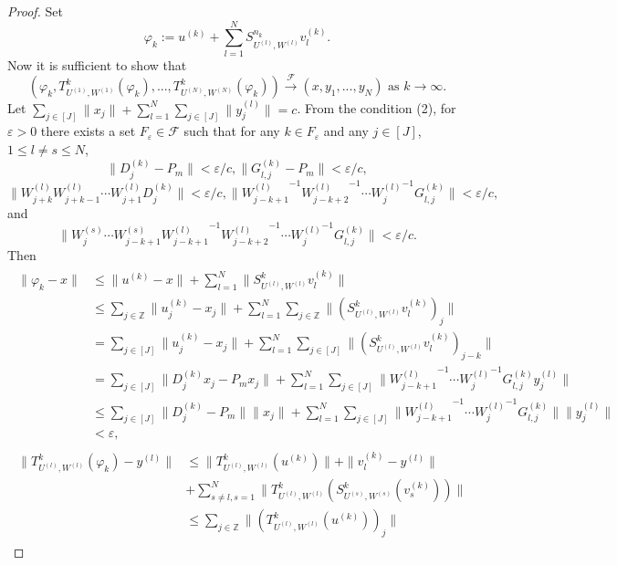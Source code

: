 \documentclass{article}
\begin{document}
\begin{proof}
	Set
	\[\varphi_{k}:=u^{(k)}+\sum^{N}_{l=1}S^{n_{k}}_{U^{(l)},W^{(l)}}v^{(k)}_{l}.\]
	Now it is sufficient to show that 
	\[(\varphi_{k}, T^{k}_{U^(1),W^(1)}(\varphi_{k}), ..., T^{k}_{U^{(N)},W^{(N)}}(\varphi_{k})) \stackrel{\mathcal F}{\longrightarrow}(x,y_{1}, ..., y_{N}) \textrm{ as } k\rightarrow\infty.\]
	Let $\sum_{j\in[J]}\|x_{j}\|+\sum^{N}_{l=1}\sum_{j\in[J]}\|y^{(l)}_{j}\|=c$.
	From the condition (2), for $\varepsilon>0$ there exists a set $F_{\varepsilon}\in\mathcal{F}$ such that for any $k\in F_{\varepsilon}$ and any $j\in [J]$, $1\leq l\neq s \leq N$,
	\[\|D^{(k)}_{j}-P_{m}\|<\varepsilon/c, \|G^{(k)}_{l,j}-P_{m}\|<\varepsilon/c,\]
	\[\|W^{(l)}_{j+k}W^{(l)}_{j+k-1}\cdots W^{(l)}_{j+1}D^{(k)}_{j}\|<\varepsilon/c,
	\|{W^{(l)}_{j-k+1}}^{-1}{W^{(l)}_{j-k+2}}^{-1}\cdots {W^{(l)}_{j}}^{-1}G^{(k)}_{l,j}\|<\varepsilon/c,\]
	and
	\[\|W^{(s)}_{j}\cdots W^{(s)}_{j-k+1}{W^{(l)}_{j-k+1}}^{-1}{W^{(l)}_{j-k+2}}^{-1}\cdots {W^{(l)}_{j}}^{-1}G^{(k)}_{l,j}\| <\varepsilon/c.\]
	Then
	\begin{eqnarray}\begin{split}\nonumber
	\|\varphi_{k}-x\|
	&\leq \|u^{(k)}-x\|+ \sum^{N}_{l=1}\|S^{k}_{U^{(l)},W^{(l)}}v^{(k)}_{l}\|
	\\
	&\leq\sum_{j\in\mathbb{Z}}\|u^{(k)}_{j}-x_{j}\|+ \sum^{N}_{l=1}\sum_{j\in\mathbb{Z}}\|(S^{k}_{U^{(l)},W^{(l)}}v^{(k)}_{l})_{j}\|
	\\
	&=\sum_{j\in[J]}\|u^{(k)}_{j}-x_{j}\|+ \sum^{N}_{l=1}\sum_{j\in[J]}\|(S^{k}_{U^{(l)},W^{(l)}}v^{(k)}_{l})_{j-k}\|
	\\
	&=\sum_{j\in[J]}\|D^{(k)}_{j}x_{j}-P_{m}x_{j}\|+ \sum^{N}_{l=1}\sum_{j\in[J]}\|{W^{(l)}_{j-k+1}}^{-1}\cdots {W^{(l)}_{j}}^{-1} G^{(k)}_{l,j}y^{(l)}_{j}\|
	\\
	&\leq \sum_{j\in[J]}\|D^{(k)}_{j}-P_{m}\|\|x_{j}\|+ \sum^{N}_{l=1}\sum_{j\in[J]}\|{W^{(l)}_{j-k+1}}^{-1}\cdots {W^{(l)}_{j}}^{-1} G^{(k)}_{l,j}\| \|y^{(l)}_{j}\|
	\\
	&<\varepsilon,
	\end{split}
	\end{eqnarray}
	\begin{eqnarray}\begin{split}\nonumber
	\|T^{k}_{U^{(l)},W^{(l)}}(\varphi_{k})-y^{(l)}\| &\leq\|T^{k}_{U^{(l)},W^{(l)}}(u^{(k)})\|+\|v^{(k)}_{l}-y^{(l)}\|
	\\
	& +\sum^{N}_{s\neq l, s=1} \|T^{k}_{U^{(l)},W^{(l)}}(S^{k}_{U^{(s)},W^{(s)}}(v^{(k)}_{s}))\|
	\\
	&\leq \sum_{j\in\mathbb{Z}}\|(T^{k}_{U^{(l)},W^{(l)}}(u^{(k)}))_{j}\|

\end{split}
\end{eqnarray}
\end{proof}
\end{document}
